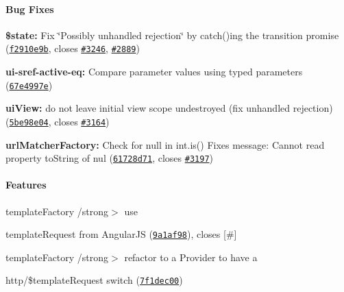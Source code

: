 \paragraph*{Bug Fixes}


\begin{DoxyItemize}
\item {\bfseries \$state\+:} Fix \char`\"{}\+Possibly unhandled rejection\char`\"{} by catch()ing the transition promise (\href{https://github.com/angular-ui/ui-router/commit/f2910e9b00ebcf652abab2af8a405b5b5fbca054}{\tt f2910e9b}, closes \href{https://github.com/angular-ui/ui-router/issues/3246}{\tt \#3246}, \href{https://github.com/angular-ui/ui-router/issues/2889}{\tt \#2889})
\item {\bfseries ui-\/sref-\/active-\/eq\+:} Compare parameter values using typed parameters (\href{https://github.com/angular-ui/ui-router/commit/67e4997eadfc1f7f5af8efd7cb676218cc69129e}{\tt 67e4997e})
\item {\bfseries ui\+View\+:} do not leave initial view scope undestroyed (fix unhandled rejection) (\href{https://github.com/angular-ui/ui-router/commit/5be98e047a096012762096922a2756a0a0a0ea60}{\tt 5be98e04}, closes \href{https://github.com/angular-ui/ui-router/issues/3164}{\tt \#3164})
\item {\bfseries url\+Matcher\+Factory\+:} Check for null in int.\+is() Fixes message\+: Cannot read property \textquotesingle{}to\+String\textquotesingle{} of nul (\href{https://github.com/angular-ui/ui-router/commit/61728d717ab4f7b03a017c4666ab1a5a1ffe4620}{\tt 61728d71}, closes \href{https://github.com/angular-ui/ui-router/issues/3197}{\tt \#3197})
\end{DoxyItemize}

\paragraph*{Features}


\begin{DoxyItemize}
\item {\bfseries \begin{DoxyParagraph}{template\+Factory}
/strong$>$ use 
\end{DoxyParagraph}
template\+Request from Angular\+JS (\href{https://github.com/angular-ui/ui-router/commit/9a1af98}{\tt 9a1af98}), closes \mbox{[}\#\mbox{]}}
\item {\bfseries {\bfseries \begin{DoxyParagraph}{template\+Factory}
/strong$>$ refactor to a Provider to have a 
\end{DoxyParagraph}
http/\$template\+Request switch (\href{https://github.com/angular-ui/ui-router/commit/7f1dec008e98ae206c53d67268c330846c4d227d}{\tt 7f1dec00})}}
\end{DoxyItemize}

